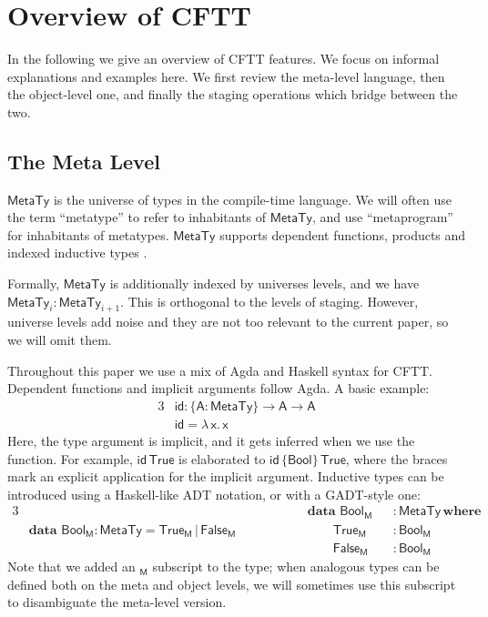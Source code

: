 \documentclass[acmsmall,screen,review,anonymous]{acmart}
\newcommand{\mit}[1]{{\mathsf{#1}}}
\newcommand{\msf}[1]{{\mathsf{#1}}}
\newcommand{\mbf}[1]{{\mathbf{#1}}}
\newcommand{\bs}[1]{\boldsymbol{#1}}
\newcommand{\ind}{\hspace{1em}}
\newcommand{\lam}{\lambda\,}
\newcommand{\data}{\mbf{data}\,}
\newcommand{\where}{\mbf{where}}
\newcommand{\M}{\msf{M}}
\newcommand{\vA}{\mathsf{A}}
\newcommand{\vx}{\mathsf{x}}
\newcommand{\Bool}{\msf{Bool}}
\newcommand{\MTy}{\msf{MetaTy}}
\newcommand{\True}{\msf{True}}
\newcommand{\False}{\msf{False}}
\theoremstyle{remark}
\newcommand{\id}{\mit{id}}
\begin{document}
\section{Overview of CFTT}\label{sec:overview-of-cftt}

In the following we give an overview of CFTT features. We focus on informal
explanations and examples here. We first review the meta-level language, then
the object-level one, and finally the staging operations which bridge between
the two.

\subsection{The Meta Level}\label{sec:the-meta-level}

$\bs{\MTy}$ is the universe of types in the compile-time language. We will often
use the term ``metatype'' to refer to inhabitants of $\MTy$, and use
``metaprogram'' for inhabitants of metatypes. $\MTy$ supports dependent
functions, products and indexed inductive types \cite{inductivefamilies}.

Formally, $\MTy$ is additionally indexed by universes levels, and we have
$\MTy_i : \MTy_{i+1}$. This is orthogonal to the levels of staging. However,
universe levels add noise and they are not too relevant to the current paper, so
we will omit them.

Throughout this paper we use a mix of Agda and Haskell syntax for
CFTT. Dependent functions and implicit arguments follow Agda. A basic example:
\begin{alignat*}{3}
  &\id : \{\vA : \MTy\} \to \vA \to \vA\\
  &\id = \lam \vx.\, \vx
\end{alignat*}
Here, the type argument is implicit, and it gets inferred when we use the
function. For example, $\id\,\True$ is elaborated to $\id\,\{\Bool\}\,\True$,
where the braces mark an explicit application for the implicit argument.
Inductive types can be introduced using a Haskell-like ADT notation, or with a
GADT-style one:
\begin{alignat*}{3}
  &                                           &&\hspace{4em}\data\,\Bool_\M &&: \MTy\,\where\\
  & \data\,\Bool_\M : \MTy = \True_\M\,|\,\False_\M &&\hspace{4em}\ind\ind \True_\M &&: \Bool_\M\\
  &                                           &&\hspace{4em}\ind\ind \False_\M &&: \Bool_\M
\end{alignat*}
Note that we added an $_\M$ subscript to the type; when analogous types can be
defined both on the meta and object levels, we will sometimes use this subscript
to disambiguate the meta-level version.
\end{document}

